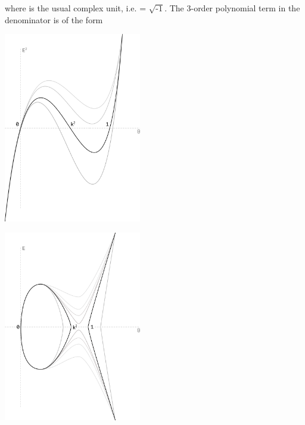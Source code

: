\documentclass[a4paper,10pt]{article}
\begin{document}
\begin{flushleft}
{{\begin{center}
  \end{center}
  \begin{flushright}
    {\vspace{-9mm}}
  \end{flushright}
  \vspace{1.85mm}
  where {} is the usual complex unit, i.e. {} = $\sqrt{\text{-1}}$. The 3-order polynomial term in the denominator is of the form
  }}
\end{flushleft}
\vspace{1.85mm}
\begin{multicols}{2}
  \noindent
  \begin{minipage}{\linewidth}
    \centering
    \includegraphics[width=60mm]{./img/ellipticSquare.png}\vspace{1mm}
    \label{fig:ci}
  \end{minipage}
  \noindent
  \begin{minipage}{\linewidth}
    \centering
    \includegraphics[width=60mm]{./img/ellipticCurve.png}\vspace{1mm}
    \label{fig:ec}
  \end{minipage}
\end{multicols}
\end{document}
